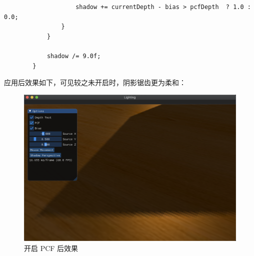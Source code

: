 \documentclass[12pt]{article}
\begin{document}
\begin{enumerate}
\begin{enumerate}
\begin{lstlisting}
                    shadow += currentDepth - bias > pcfDepth  ? 1.0 : 0.0;
                }
            }

            shadow /= 9.0f;
        }
        \end{lstlisting}

        应用后效果如下，可见较之未开启时，阴影锯齿更为柔和：
        \begin{figure}[H]
            \centering
            \includegraphics[scale=0.3]{pcf.png}
            \caption{开启 PCF 后效果}
            \label{}
        \end{figure}

    \end{enumerate}
    
\end{enumerate}
\end{document}
